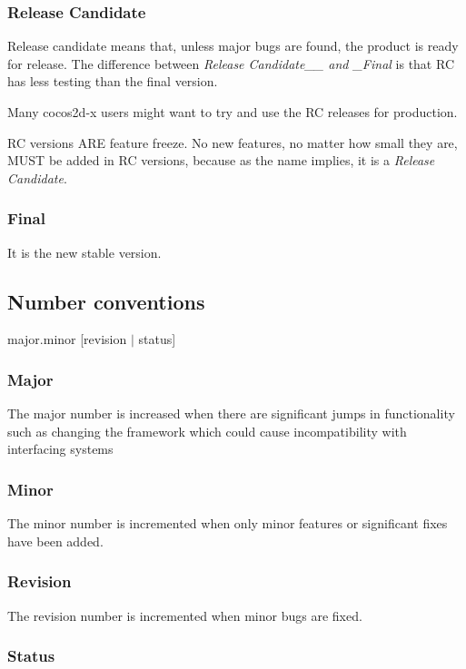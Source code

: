 \subsubsection*{Release Candidate}

Release candidate means that, unless major bugs are found, the product is ready for release. The difference between {\itshape Release Candidate\+\_\+\+\_\+ and \+\_\+\+Final} is that RC has less testing than the final version.

Many cocos2d-\/x users might want to try and use the RC releases for production.

RC versions A\+RE feature freeze. No new features, no matter how small they are, M\+U\+ST be added in RC versions, because as the name implies, it is a {\itshape Release Candidate}.

\subsubsection*{Final}

It is the new stable version.

\subsection*{Number conventions}

major.\+minor \mbox{[}revision $\vert$ status\mbox{]}

\subsubsection*{Major}

The major number is increased when there are significant jumps in functionality such as changing the framework which could cause incompatibility with interfacing systems

\subsubsection*{Minor}

The minor number is incremented when only minor features or significant fixes have been added.

\subsubsection*{Revision}

The revision number is incremented when minor bugs are fixed.

\subsubsection*{Status}

